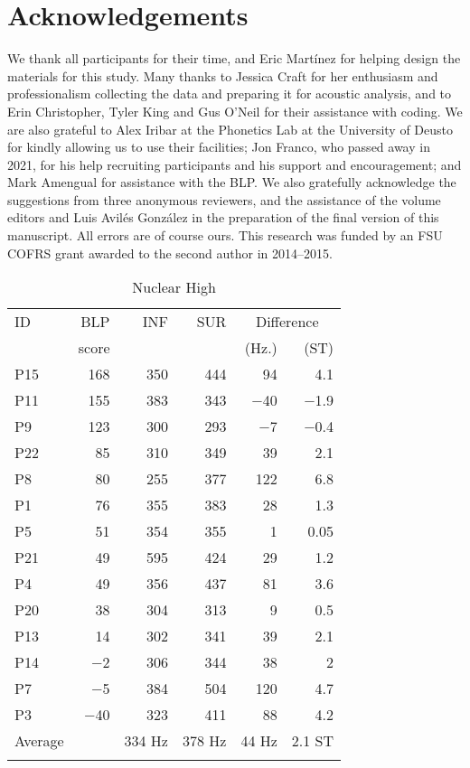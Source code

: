 \documentclass[output=paper,colorlinks,citecolor=brown,draftmode]{langscibook}
\begin{document}
\section*{Acknowledgements}
We thank all participants for their time, and Eric Mart\'inez for helping design the materials for this study. Many thanks to Jessica Craft for her enthusiasm and professionalism collecting the data and preparing it for acoustic analysis, and to Erin Christopher, Tyler King and Gus O’Neil for their assistance with coding. We are also grateful to Alex Iribar at the Phonetics Lab at the University of Deusto for kindly allowing us to use their facilities; Jon Franco, who passed away in 2021, for his help recruiting participants and his support and encouragement; and Mark Amengual for assistance with the BLP. We also gratefully acknowledge the suggestions from three anonymous reviewers, and the assistance of the volume editors and Luis Avil\'es Gonz\'alez in the preparation of the final version of this manuscript. All errors are of course ours. This research was funded by an FSU COFRS grant awarded to the second author in 2014--2015.


\appendixsection{}\label{13:app:1:NHigh}

\begin{table}[H]
\caption{Nuclear High}
\label{13:table3}
 \begin{tabular}{l rrrrr}
  \lsptoprule
  ID & BLP&INF&SUR&\multicolumn{2}{c}{Difference} \\
  \cmidrule(lr){5-6}
  &score&&&(Hz.)&(ST)\\

  \midrule
P15&168&350&444&94&4.1\\
P11&155&383&343&$-$40&$-$1.9\\
P9&123&300&293&$-$7&$-$0.4\\
P22&85&310&349&39&2.1\\
P8&80&255&377&122&6.8\\
P1&76&355&383&28&1.3\\
P5&51&354&355&1&0.05\\
P21&49&595&424&29&1.2\\
P4&49&356&437&81&3.6\\
P20&38&304&313&9&0.5\\
P13&14&302&341&39&2.1\\
P14&$-$2&306&344&38&2\\
P7&$-$5&384&504&120&4.7\\
P3&$-$40&323&411&88&4.2\\
\hline
Average&&334 Hz&378 Hz&44 Hz&2.1 ST\\
  \lspbottomrule
 \end{tabular}
\end{table}
\end{document}
